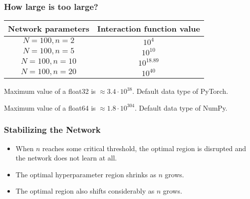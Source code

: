 \begin{frame}
    \frametitle{How large is too large?}

    \begin{center}
        \begin{tabular}{| c | c |}
            \hline
            Network parameters & Interaction function value \\
            \hline
            \hline
            \(N=100, n=2\) & \(10^{4}\) \\
            \hline
            \(N=100, n=5\) & \(10^{10}\) \\
            \hline
            \(N=100, n=10\) & \(10^{18.89}\) \\
            \hline
            \(N=100, n=20\) & \(10^{40}\) \\
            \hline
        \end{tabular}
    \end{center}

    \pause
    Maximum value of a float32 is \(\approx 3.4 \cdot 10^{38}\). Default data type of PyTorch.

    \pause
    Maximum value of a float64 is \(\approx 1.8 \cdot 10^{304}\). Default data type of NumPy.
\end{frame}

\begin{frame}
    \frametitle{Stabilizing the Network}
    
    \begin{itemize}
        \item When \(n\) reaches some critical threshold, the optimal region is disrupted and the network does not learn at all.
        \pause
        \item The optimal hyperparameter region shrinks as \(n\) grows.
        \pause
        \item The optimal region also shifts considerably as \(n\) grows.
    \end{itemize}    
\end{frame}
    

